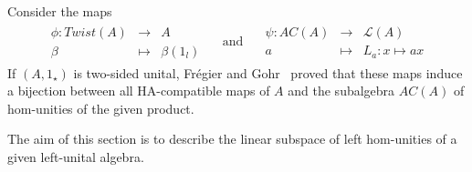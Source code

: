 \documentclass[12pt]{article}
\begin{document}
		Consider the maps
		\begin{align}
			\begin{array}{ccc}
				\phi:Twist(A)& \rightarrow &   A   \\
				\beta & \mapsto & \beta(1_l)
			\end{array} \quad \text{ and } \quad
			\begin{array}{ccc}
				\psi:AC(A)& \rightarrow &  \mathcal{L}(A)   \\
				a & \mapsto & L_a:x\mapsto ax
			\end{array}
		\end{align}
		If $(A,1_\star)$ is two-sided unital, Fr\'{e}gier and Gohr~\cite{FreGohr:UnitCond} proved that these maps induce a bijection between all HA-compatible maps of $A$ and the subalgebra $AC(A)$ of hom-unities of the given product.
		
		The aim of this section is to describe the linear subspace of left hom-unities of a given left-unital algebra.
		
\end{document}
